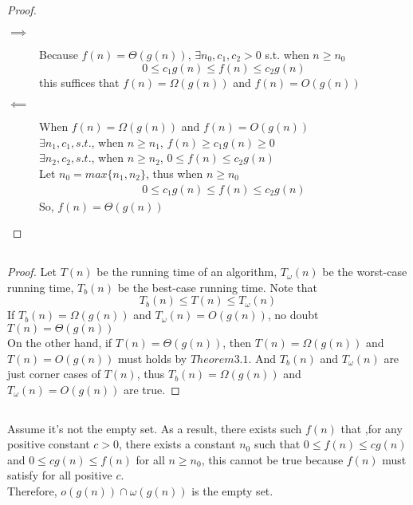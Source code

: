 \documentclass[paper=a4, fontsize=11pt,oneside]{book} %
\numberwithin{equation}{section} %
\numberwithin{figure}{section} %
\numberwithin{table}{section} %
\begin{document}
	\subsection{}
		\begin{proof}
			\begin{description}
				\item[$\implies$]
			Because  $f(n) = \Theta(g(n))$, $\exists n_0, c_1, c_2 > 0$ s.t. when $n \geq n_0$
			\begin{equation*}
			0 \leq c_1g(n) \leq f(n) \leq c_2g(n)
			\end{equation*}
			this suffices that $f(n) = \Omega(g(n))$ and $f(n) = O(g(n))$
			
			\item[$\impliedby$]
			When $f(n) = \Omega(g(n))$ and $f(n) = O(g(n))$ \\
			$\exists n_1, c_1, s.t.$, when $n \geq n_1$, $f(n) \geq c_1g(n) \geq 0$ \\
			 $\exists n_2, c_2, s.t.$, when $n \geq n_2$, $0 \leq f(n) \leq c_2g(n)$ \\
			 Let $n_0 = max\{n_1, n_2\}$, thus when $n \geq n_0$
			 \begin{align*}
			 0 \leq c_1g(n) \leq f(n) \leq c_2g(n)
			 \end{align*}
			 So, $f(n) = \Theta(g(n))$
			\end{description}
		\end{proof}
	
	\subsection{}
		\begin{proof}
			Let $T(n)$ be the running time of an algorithm, $T_{\omega}(n)$ be the worst-case running time, $T_b(n)$ be the best-case running time.
			Note that 
			\begin{equation*}
			T_b(n) \leq T(n) \leq T_{\omega}(n)
			\end{equation*} 
			If $T_b(n) = \Omega(g(n))$ and $T_{\omega}(n) = O(g(n))$, no doubt
			$T(n) = \Theta(g(n))$
			\\
			On the other hand, if $T(n) = \Theta(g(n))$, then $T(n) = \Omega(g(n))$ and $T(n) = O(g(n))$ must holds by $Theorem 3.1$. And $T_b(n)$ and $T_{\omega}(n)$ are just corner cases of $T(n)$, thus $T_b(n) = \Omega(g(n))$ and $T_{\omega}(n) = O(g(n))$ are true.
		\end{proof}
		
	\subsection{}
		Assume it's not the empty set. As a result, there exists such $f(n)$ that
		,for any positive constant $c > 0$, there exists a constant $n_0$ such that 
		$0 \leq f(n) \leq cg(n)$ and $0 \leq cg(n) \leq f(n)$ for all $n \geq n_0$,
		this cannot be true because $f(n)$ must satisfy for all positive $c$.\\
		Therefore, $o(g(n)) \cap \omega(g(n))$ is the empty set.
		
\end{document}
